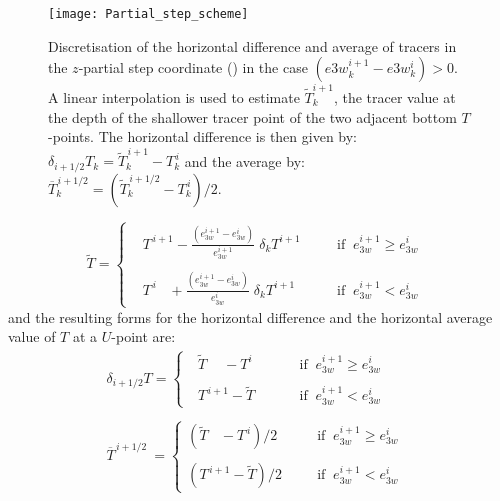 \documentclass[../tex_main/NEMO_manual]{subfiles}
\begin{document}
\begin{figure}[!p] 	 \begin{center}
\texttt{[image: Partial\_step\_scheme]}
\caption{ 	\protect\label{fig:Partial_step_scheme} 
Discretisation of the horizontal difference and average of tracers in the $z$-partial 
step coordinate (\protect{}) in the case $( e3w_k^{i+1} - e3w_k^i  )>0$. 
A linear interpolation is used to estimate $\widetilde{T}_k^{i+1}$, the tracer value 
at the depth of the shallower tracer point of the two adjacent bottom $T$-points. 
The horizontal difference is then given by: $\delta _{i+1/2} T_k=  \widetilde{T}_k^{\,i+1} -T_k^{\,i}$ 
and the average by: $\overline{T}_k^{\,i+1/2}= ( \widetilde{T}_k^{\,i+1/2} - T_k^{\,i} ) / 2$.  }
\end{center}   \end{figure}
\begin{equation*}
\widetilde{T}= \left\{  \begin{aligned}  
&T^{\,i+1}      -\frac{ \left( e_{3w}^{i+1} -e_{3w}^i \right)}{ e_{3w}^{i+1} }\;\delta _k T^{i+1}	
 								&& \quad\text{if  $\ e_{3w}^{i+1} \geq e_{3w}^i$   } 	\\
										\\
&T^{\,i} \ \ \ \,+\frac{ \left( e_{3w}^{i+1} -e_{3w}^i \right) }{e_{3w}^i       }\;\delta _k T^{i+1}
			 					&& \quad\text{if  $\ e_{3w}^{i+1}    <   e_{3w}^i$   } 
            \end{aligned}   \right.
\end{equation*}
and the resulting forms for the horizontal difference and the horizontal average 
value of $T$ at a $U$-point are: 
\begin{equation} \label{eq:zps_hde}
\begin{aligned}
 \delta _{i+1/2} T= 	\begin{cases}
\ \ \ \widetilde {T}\quad\ -T^i	 	& \ \ \quad\quad\text{if  $\ e_{3w}^{i+1} \geq e_{3w}^i$ } \\
										\\
\ \ \ T^{\,i+1}-\widetilde{T}		& \ \ \quad\quad\text{if  $\ e_{3w}^{i+1}    <   e_{3w}^i$   } 
            		\end{cases}     \\
\\
\overline {T}^{\,i+1/2} \ = 	\begin{cases}
( \widetilde {T}\ \ \;\,-T^{\,i})	 / 2	& \;\ \ \quad\text{if  $\ e_{3w}^{i+1} \geq e_{3w}^i$ } \\
										\\
( T^{\,i+1}-\widetilde{T} ) / 2		& \;\ \ \quad\text{if  $\ e_{3w}^{i+1}    <   e_{3w}^i$   } 
            \end{cases}
\end{aligned}
\end{equation}
\end{document}

